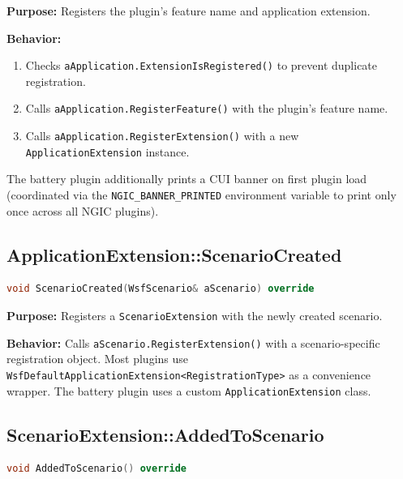 \unclass \textbf{Purpose:} Registers the plugin's feature name and application extension.

\unclass \textbf{Behavior:}
\begin{enumerate}
    \item \unclass Checks \texttt{aApplication.ExtensionIsRegistered()} to prevent duplicate registration.
    \item \unclass Calls \texttt{aApplication.RegisterFeature()} with the plugin's feature name.
    \item \unclass Calls \texttt{aApplication.RegisterExtension()} with a new \texttt{ApplicationExtension} instance.
\end{enumerate}

\unclass The battery plugin additionally prints a CUI banner on first plugin load (coordinated via the \texttt{NGIC\_BANNER\_PRINTED} environment variable to print only once across all NGIC plugins).

\subsection{\unclass ApplicationExtension::ScenarioCreated}

\begin{codebox}
\begin{lstlisting}[language=C++,mathescape=false]
void ScenarioCreated(WsfScenario& aScenario) override
\end{lstlisting}
\end{codebox}

\unclass \textbf{Purpose:} Registers a \texttt{ScenarioExtension} with the newly created scenario.

\unclass \textbf{Behavior:} Calls \texttt{aScenario.RegisterExtension()} with a scenario-specific registration object. Most plugins use \texttt{WsfDefaultApplicationExtension<RegistrationType>} as a convenience wrapper. The battery plugin uses a custom \texttt{ApplicationExtension} class.

\subsection{\unclass ScenarioExtension::AddedToScenario}

\begin{codebox}
\begin{lstlisting}[language=C++,mathescape=false]
void AddedToScenario() override
\end{lstlisting}
\end{codebox}

